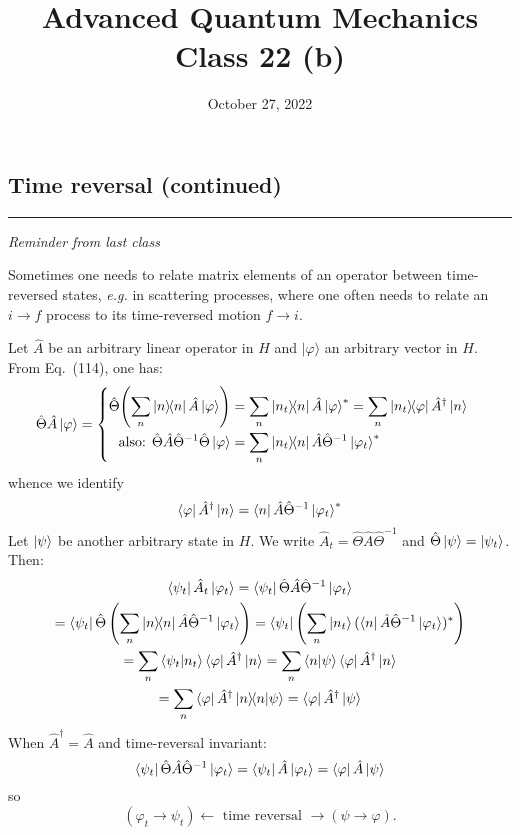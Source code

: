 \documentclass[12pt]{article}
\title{Advanced Quantum Mechanics\\Class 22 (b)}
\date{October 27, 2022}                                           %
\newcommand{\be}{\begin{equation}}
\newcommand{\ee}{\end{equation}}
\begin{document}
\maketitle

\subsection{Time reversal (continued)}

\par\noindent\rule{\textwidth}{1pt}
\emph{Reminder from last class}

Sometimes one needs to relate matrix elements of
an operator between time-reversed states, \textit{e.g.} in
scattering processes, where one often needs to relate
an $i \rightarrow f$ process to its time-reversed motion $f \rightarrow i$.

Let $\hat{A}$ be an arbitrary linear operator in $H$ and
$|\varphi\rangle$ an arbitrary vector in $H$. From Eq.~(114),
one has:
\be
\hat{\Theta} \hat{A} \ket{\varphi}=
\begin{cases}
\begin{aligned}
\hat{\Theta}\!\left(\sum_n\op{n}\hat{A}\ket{\varphi}\right) 
&= \sum_n \op{n_t}{n}\hat{A}\ket{\varphi}^*
= \sum_n \op{n_t}{\varphi}\hat{A}^{\dagger}\ket{n}\\
\text{also: }\hat{\Theta}\hat{A}\hat{\Theta}^{-1}\hat{\Theta}\ket{\varphi} 
&= \sum_n \op{n_t}{n}\hat{A}\hat{\Theta}^{-1}\ket{\varphi_t}^*
\end{aligned}
\end{cases}
\ee
whence we identify
\[
\bra{\varphi}\hat{A}^{\dagger}\ket{n} = \bra{n}\hat{A}\hat{\Theta}^{-1}\ket{\varphi_t}^*
\]
%
Let $\ket{\psi}$ be another arbitrary state in $H$. We write 
$\hat{A}_t = \hat{\Theta}\hat{A}\hat{\Theta}^{-1}$
and
$\hat{\Theta}\ket{\psi} = \ket{\psi_t}$.
Then:
\be
\begin{gathered}
\bra{\psi_t}\hat{A}_t\ket{\varphi_t} =
\bra{\psi_t}\hat{\Theta}\hat{A}\hat{\Theta}^{-1}\ket{\varphi_t}\\
 = \bra{\psi_t}\hat{\Theta}\left(
\sum_n\op{n}\hat{A}\hat{\Theta}^{-1}\ket{\varphi_t}
\right)
 = \bra{\psi_t}\left(
\sum_n\ket{n_t}(\bra{n}\hat{A}\hat{\Theta}^{-1}\ket{\varphi_t})^*
\right)\\
=\sum_n \bra{\psi_t}\ket{n_t} \bra{\varphi}\hat{A}^{\dagger}\ket{n}
=\sum_n \bra{n}\ket{\psi} \bra{\varphi}\hat{A}^{\dagger}\ket{n}\\
=\sum_n \bra{\varphi}\hat{A}^{\dagger} \ket{n}\!\!\bra{n}\ket{\psi}
= \bra{\varphi}\hat{A}^{\dagger}\ket{\psi}
\end{gathered}
\label{eq:g117}
\ee
When $\hat{A}^{\dagger} = \hat{A}$ and time-reversal invariant:
\be
\bra{\psi_t}\hat{\Theta}\hat{A}\hat{\Theta}^{-1}\ket{\varphi_t} = 
\bra{\psi_t}\hat{A}\ket{\varphi_t} =
\bra{\varphi}\hat{A}\ket{\psi}
\ee
so
\[
(\varphi_t \to \psi_t) \leftarrow \text{ time reversal }\rightarrow (\psi \to \varphi).
\]
\end{document}

